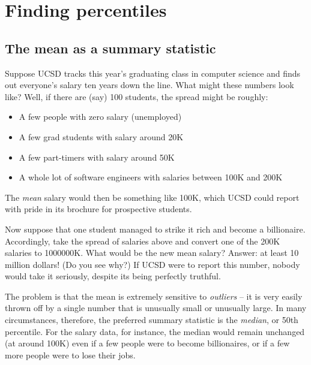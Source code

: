 \documentclass{report}
\theoremstyle{plain}
\theoremstyle{definition}
\begin{document}
\lecturer{}
\scribe{}

\maketitle

\section{Finding percentiles}

\subsection{The mean as a summary statistic}

Suppose UCSD tracks this year's graduating class in computer science and finds out everyone's 
salary ten years down the line. What might these numbers look like? Well, if there are (say)
100 students, the spread might be roughly:
\begin{itemize}
\item A few people with zero salary (unemployed)
\item A few grad students with salary around 20K
\item A few part-timers with salary around 50K
\item A whole lot of software engineers with salaries between 100K and 200K
\end{itemize}
The {\it mean} salary would then be something like 100K, which UCSD could report with
pride in its brochure for prospective students.

Now suppose that one student managed to strike it rich and become a billionaire. 
Accordingly, take the spread of salaries above and convert one of the 200K salaries 
to 1000000K. What would be the new mean salary? Answer: at least 10 million dollars! 
(Do you see why?) If UCSD were to report this number, nobody would take it seriously,
despite its being perfectly truthful.

The problem is that the mean is extremely sensitive to {\it outliers} -- it is very 
easily thrown off by a single number that is unusually small or unusually large. In
many circumstances, therefore, the preferred summary statistic is the {\it median}, 
or 50th percentile. For the salary data, for instance, the median would remain 
unchanged (at around 100K) even if a few people were to become billionaires, or if 
a few more people were to lose their jobs.
\end{document}

